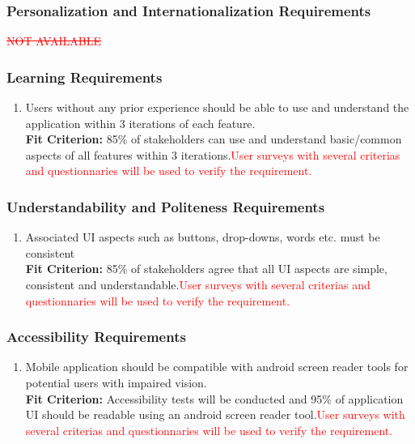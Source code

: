 \documentclass[12pt,letterpaper]{article}
\begin{document}
\subsubsection{Personalization and Internationalization Requirements}
\textcolor{red}{\sout{NOT AVAILABLE}}
\subsubsection{Learning Requirements}
\begin{enumerate}[resume*] 
	\item Users without any prior experience should be able to use and understand the application within 3 iterations of each feature.\\
	{\textbf{Fit Criterion:} 85\% of stakeholders can use and understand basic/common aspects of all features within 3 iterations.{\textcolor{red}{User surveys with several criterias and questionnaries will be used to verify the requirement.}}}
\end{enumerate}

\subsubsection{Understandability and Politeness Requirements}
\begin{enumerate}[resume*] 
	\item Associated UI aspects such as buttons, drop-downs, words etc. must be consistent\\
	{\textbf{Fit Criterion:} 85\% of stakeholders agree that all UI aspects are simple, consistent and understandable.{\textcolor{red}{User surveys with several criterias and questionnaries will be used to verify the requirement.}}}
\end{enumerate}

\subsubsection{Accessibility Requirements}
\begin{enumerate}[resume*] 
	\item Mobile application should be compatible with android screen reader tools for potential users with impaired vision.\\
	{\textbf{Fit Criterion:} Accessibility tests will be conducted and 95\% of application UI should be readable using an android screen reader tool.{\textcolor{red}{User surveys with several criterias and questionnaries will be used to verify the requirement.}}}
\end{enumerate}
\end{document}
